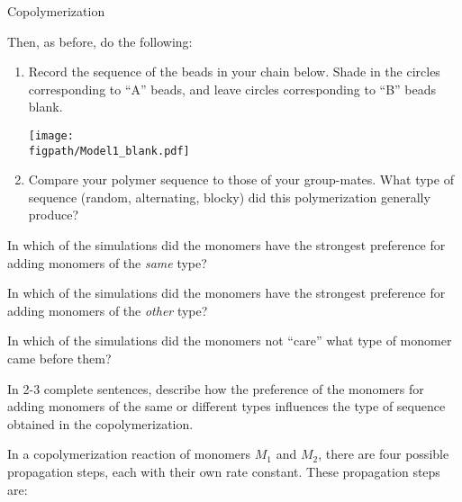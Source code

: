 \begin{activity}{Copolymerization}
\begin{ctqs}
		Then, as before, do the following:
		\begin{enumerate}
			\item Record the sequence of the beads in your chain below.  Shade in the circles corresponding to ``A'' beads, and leave circles corresponding to ``B'' beads blank.
	
		\vspace{6pt}
		\centerline{\texttt{[image: \\figpath/Model1\_blank.pdf]}}
	
			\item Compare your polymer sequence to those of your group-mates.  What type of sequence (random, alternating, blocky) did this polymerization generally produce?
			
				\begin{solution}[1.25in]
				\end{solution}
		\end{enumerate}
		
	\question In which of the simulations did the monomers have the strongest preference for adding monomers of the \emph{same} type?
	
		\begin{solution}[0.85in]
		\end{solution}
	
	\question In which of the simulations did the monomers have the strongest preference for adding monomers of the \emph{other} type?
	
		\begin{solution}[0.85in]
		\end{solution}
	
	\question In which of the simulations did the monomers not ``care'' what type of monomer came before them?
	
		\begin{solution}[0.85in]
		\end{solution}
	
	\question In 2-3 complete sentences, describe how the preference of the monomers for adding monomers of the same or different types influences the type of sequence obtained in the copolymerization.
	
		\begin{solution}[2in]
		\end{solution}
\end{ctqs}

\begin{model}

	In a copolymerization reaction of monomers $M_1$ and $M_2$, there are four possible propagation steps, each with their own rate constant.  These propagation steps are:
	

\end{model}
\end{activity}
